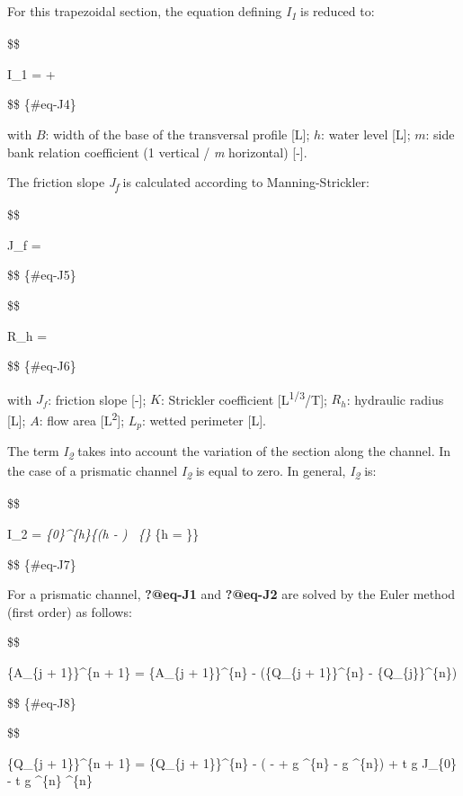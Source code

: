 \documentclass[
  letterpaper,
  DIV=11,
  numbers=noendperiod]{scrreprt}
\begin{document}
For this trapezoidal section, the equation defining
\emph{I\textsubscript{1}} is reduced to:

\$\$

I\_1 =  + 

\$\$ \{\#eq-J4\}

with \(B\): width of the base of the transversal profile {[}L{]}; \(h\):
water level {[}L{]}; \(m\): side bank relation coefficient (1 vertical /
\emph{m} horizontal) {[}-{]}.

The friction slope \emph{J\textsubscript{f}} is calculated according to
Manning-Strickler:

\$\$

J\_f = 

\$\$ \{\#eq-J5\}

\$\$

R\_h = 

\$\$ \{\#eq-J6\}

with \(J_f\): friction slope {[}-{]}; \(K\): Strickler coefficient
{[}L\textsuperscript{1/3}/T{]}; \(R_h\): hydraulic radius {[}L{]};
\(A\): flow area {[}L\textsuperscript{2}{]}; \(L_p\): wetted perimeter
{[}L{]}.

The term \emph{I\textsubscript{2}} takes into account the variation of
the section along the channel. In the case of a prismatic channel
\emph{I\textsubscript{2}} is equal to zero. In general,
\emph{I\textsubscript{2}} is:

\$\$

I\_2 = \int\emph{\{0\}\^{}\{h\}\{(h - \eta)
~\{\} \textbar{}}\{h = \eta\}\}

\$\$ \{\#eq-J7\}

For a prismatic channel, \textbf{?@eq-J1} and \textbf{?@eq-J2} are
solved by the Euler method (first order) as follows:

\$\$

\{A\_\{j + 1\}\}\^{}\{n + 1\} = \{A\_\{j + 1\}\}\^{}\{n\} -
(\{Q\_\{j + 1\}\}\^{}\{n\} -
\{Q\_\{j\}\}\^{}\{n\})

\$\$ \{\#eq-J8\}

\$\$

\{Q\_\{j + 1\}\}\^{}\{n + 1\} = \{Q\_\{j + 1\}\}\^{}\{n\} -
(
-  + g \^{}\{n\}
- g \^{}\{n\}) + \Delta t \cdot g
\cdot {} \cdot J\_\{0\} -
\Delta t \cdot g \^{}\{n\}
\^{}\{n\}
\end{document}
